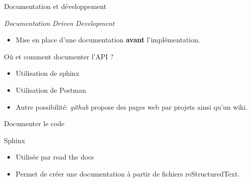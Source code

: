 \begin{frame}{Documentation et développement}
  \begin{block}{\textit{Documentation Driven Development}}
    \begin{itemize}
    \item Mise en place d'une documentation \textbf{avant} l'implémentation.
    \end{itemize}
  \end{block}

  
  \begin{block}{Où et comment documenter l'API ?}
    \begin{itemize}
    \item Utilisation de \textsf{sphinx}
    \item Utilisation de \textsf{Postman}
    \item Autre possibilité: \textit{github} propose des pages web par projets ainsi qu'un wiki.
    \end{itemize}
  \end{block}  
\end{frame}

\begin{frame}{Documenter le code}
  \begin{block}{Sphinx}
    \begin{itemize}
    \item Utilisée par \textsf{read the docs}
    \item Permet de créer une documentation à partir de fichiers
      \textsf{reStructuredText}.
    \end{itemize}
  \end{block}  
\end{frame}

